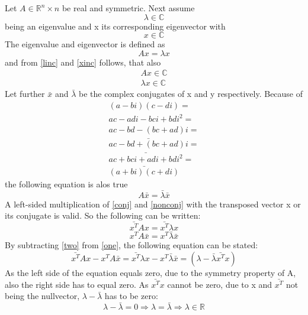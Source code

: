 \documentclass{article}
\begin{document}
Let $A \in \mathbb{R}^n\times n$  
be real and symmetric. Next assume 
\begin{equation}
\label{linc}
\lambda \in \mathbb{C}
\end{equation}
 being an eigenvalue and x its corresponding eigenvector with
 \begin{equation}
 \label{xinc}
 x \in \mathbb{C}
 \end{equation}
 The eigenvalue and eigenvector is defined as
 \begin{equation}
 \label{nonconj}
 Ax=\lambda x
 \end{equation}
 and from \ref{linc} and \ref{xinc} follows, that also
 \begin{eqnarray}
 Ax \in \mathbb{C} \\
 \lambda x \in \mathbb{C}
 \end{eqnarray}
 Let further $\bar{x}$ and $\bar{\lambda}$ be the complex conjugates of x and y respectively.
 Because of
 \begin{eqnarray}
 (a-bi)(c-di) = \\
 ac - adi - bci + bdi^2 = \\
 ac - bd - (bc + ad)i = \\
 \bar{ac - bd + (bc+ad)i} = \\
 \bar{ac +bci + adi + bdi^2} = \\
 \bar{(a+bi)(c+di)}
 \end{eqnarray}
 the following equation is alos true
 \begin{equation}
 \label{conj}
 A\bar{x} = \bar{\lambda}\bar{x}
 \end{equation}
 A left-sided multiplication of \ref{conj} and \ref{nonconj} with the transposed vector x or its conjugate is valid. So the following can be written:
 \begin{equation}
 \label{one}
 \bar{x^T}Ax = \bar{x^T} \lambda x
 \end{equation}
 \begin{equation}
 \label{two}
  x^TA\bar{x} = x^T \bar{\lambda} \bar{x}
 \end{equation}
 By subtracting \ref{two} from \ref{one}, the following equation can be stated:
 \begin{equation}
 \bar{x^T} A x - x^T A \bar{x} = \bar{x^T} \lambda x - x^T \bar{\lambda} \bar{x} = (\lambda - \bar{\lambda}\bar{x^T}x)
 \end{equation}
 As the left side of the equation equals zero, due to the symmetry property of A, also the right side has to equal zero.
 As $\bar{x^T}x$ cannot be zero, due to x and $\bar{x^T}$ not being the nullvector, $\lambda-\bar{\lambda}$ has to be zero:
 \begin{equation}
 \lambda - \bar{\lambda} = 0 \Rightarrow \lambda = \bar{\lambda} \Rightarrow \lambda \in \mathbb{R}
 \end{equation}
 
\end{document}
